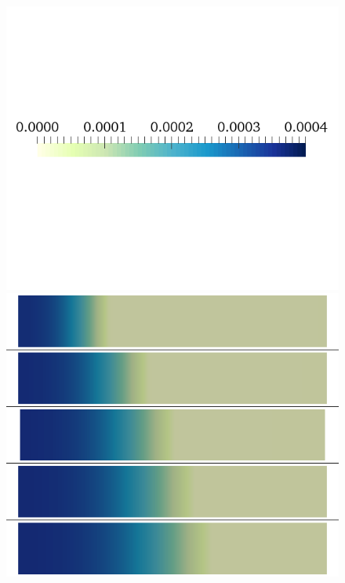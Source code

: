 \documentclass[12pt,a4paper]{article}
\begin{document}
\begin{figure}
\begin{minipage}{0.5\textwidth}
\includegraphics[trim=0cm 7cm 0cm 6cm, clip=true, width=1\linewidth]{legend_cai}
\includegraphics[trim=0cm 0cm 0cm 0cm, clip=true, width=1\linewidth]{cai_gna}
    \end{minipage}
    \begin{minipage}{0.5\textwidth}

\end{minipage}
\end{figure}
\end{document}
